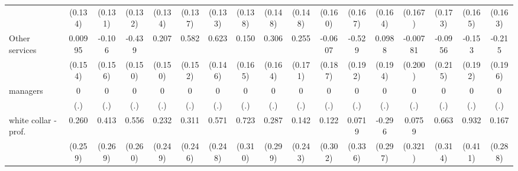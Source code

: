 {\begin{tabular}{l*{16}{c}}
                    &     (0.134)         &     (0.131)         &     (0.132)         &     (0.134)         &     (0.137)         &     (0.133)         &     (0.138)         &     (0.148)         &     (0.148)         &     (0.160)         &     (0.167)         &     (0.164)         &     (0.167)         &     (0.173)         &     (0.165)         &     (0.163)         \\
[1em]
Other services      &     0.00995         &      -0.106         &      -0.439\sym{**} &       0.207         &       0.582\sym{***}&       0.623\sym{***}&       0.150         &       0.306         &       0.255         &     -0.0607         &      -0.529\sym{**} &      0.0988         &    -0.00781         &     -0.0956         &      -0.153         &      -0.215         \\
                    &     (0.154)         &     (0.156)         &     (0.150)         &     (0.150)         &     (0.152)         &     (0.146)         &     (0.165)         &     (0.164)         &     (0.171)         &     (0.187)         &     (0.192)         &     (0.194)         &     (0.200)         &     (0.215)         &     (0.192)         &     (0.196)         \\
[1em]
managers            &           0         &           0         &           0         &           0         &           0         &           0         &           0         &           0         &           0         &           0         &           0         &           0         &           0         &           0         &           0         &           0         \\
                    &         (.)         &         (.)         &         (.)         &         (.)         &         (.)         &         (.)         &         (.)         &         (.)         &         (.)         &         (.)         &         (.)         &         (.)         &         (.)         &         (.)         &         (.)         &         (.)         \\
[1em]
white collar - prof.&       0.260         &       0.413         &       0.556\sym{*}  &       0.232         &       0.311         &       0.571\sym{*}  &       0.723\sym{*}  &       0.287         &       0.142         &       0.122         &      0.0719         &      -0.296         &      0.0759         &       0.663\sym{*}  &       0.932\sym{*}  &       0.167         \\
                    &     (0.259)         &     (0.269)         &     (0.260)         &     (0.249)         &     (0.246)         &     (0.248)         &     (0.310)         &     (0.299)         &     (0.243)         &     (0.302)         &     (0.336)         &     (0.297)         &     (0.321)         &     (0.314)         &     (0.411)         &     (0.288)         \\

\end{tabular}}
